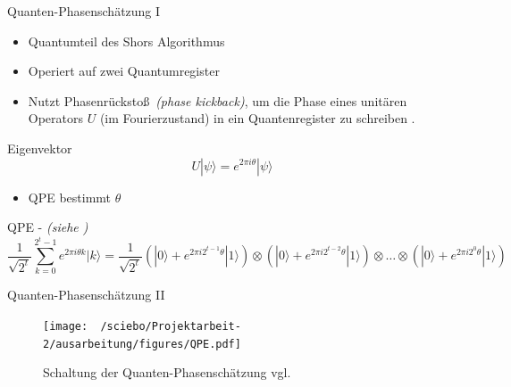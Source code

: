\documentclass[compress,aspectratio=1610]{beamer}
\begin{document}
\begin{frame}{Quanten-Phasenschätzung I}
  \begin{minipage}{0.6\textwidth}
    \begin{itemize}
    \item Quantumteil des Shors Algorithmus
    \item Operiert auf zwei Quantumregister
    \item Nutzt Phasenr\"ucksto\ss \, \textit{(phase kickback)}, um die Phase eines unit\"aren Operators $U$ (im Fourierzustand) in ein Quantenregister zu schreiben \cite{Qiskit-Textbook}.
    \end{itemize}
  \end{minipage}
  \begin{minipage}{0.35\textwidth}
    \begin{block}{Eigenvektor}
      $$U|\psi\rangle = e^{2\pi i\theta}|\psi\rangle$$
      \begin{itemize}
      \item QPE bestimmt $\theta$
      \end{itemize}
    \end{block}
  \end{minipage}
  \begin{block}{QPE - \textit{(siehe \cite{Qiskit-Textbook})}}
    $$\frac{1}{\sqrt{2^t}}\sum\limits_{k=0}^{2^t-1}e^{2\pi i\theta k}|k\rangle = \frac{1}{\sqrt{2^t}} \left(|0\rangle+e^{2\pi i 2^{t-1}\theta}|1\rangle\right)\otimes\left(|0\rangle+e^{2\pi i 2^{t-2}\theta}|1\rangle\right)\otimes\dots\otimes\left(|0\rangle+e^{2\pi i 2^{0}\theta}|1\rangle\right)$$
  \end{block}
\end{frame}

\begin{frame}{Quanten-Phasensch\"atzung II}
  \begin{figure}
    \centering
    \texttt{[image: ~/sciebo/Projektarbeit-2/ausarbeitung/figures/QPE.pdf]}
    \caption{Schaltung der Quanten-Phasensch\"atzung vgl. \cite{nielsen_chuang_2010}}
  \end{figure}
\end{frame}
\end{document}
